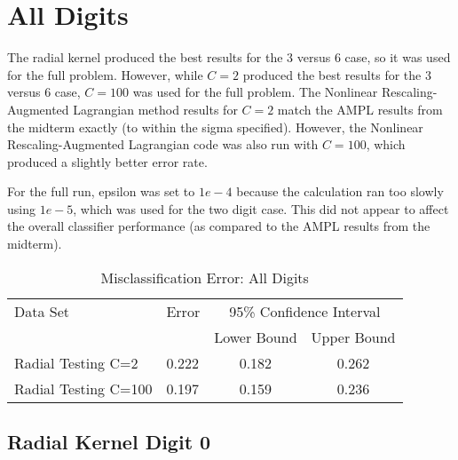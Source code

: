 \documentclass{article}
\begin{document}
\section{All Digits}\label{digit-all}
\normalsize

The radial kernel produced the best results for the 3 versus 6 case, so it was used for the full problem. However, while \(C=2\) produced the best results for the 3 versus 6 case, \(C=100\) was used for the full problem. The Nonlinear Rescaling-Augmented Lagrangian method results for \(C=2\) match the AMPL results from the midterm exactly (to within the sigma specified). However, the Nonlinear Rescaling-Augmented Lagrangian code was also run with \(C=100\), which produced a slightly better error rate.

For the full run, epsilon was set to \(1e-4\) because the calculation ran too slowly using \(1e-5\), which was used for the two digit case. This did not appear to affect the overall classifier performance (as compared to the AMPL results from the midterm).

\begin{table}
\caption{Misclassification Error: All Digits}
\begin{center}
\begin{tabular}{llcc}
\toprule
Data Set & Error & \multicolumn{2}{c}{95\% Confidence Interval} \\
\cmidrule(r){3-4}
& & Lower Bound & Upper Bound \\
\midrule
Radial Testing C=2 & 0.222 & 0.182 & 0.262 \\
Radial Testing C=100 & 0.197 & 0.159 & 0.236 \\
\bottomrule
\end{tabular}
\end{center}
\label{table2}
\end{table}

\subsection{Radial Kernel Digit 0}\label{radial0}
\end{document}
